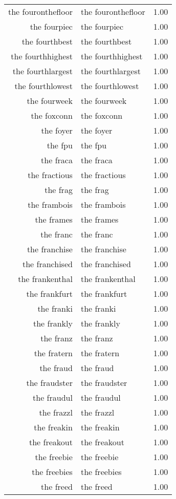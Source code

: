 \begin{table}[ht]
\begin{tabular}{rlr}
  the fouronthefloor & the fouronthefloor & 1.00 \\ 
  the fourpiec & the fourpiec & 1.00 \\ 
  the fourthbest & the fourthbest & 1.00 \\ 
  the fourthhighest & the fourthhighest & 1.00 \\ 
  the fourthlargest & the fourthlargest & 1.00 \\ 
  the fourthlowest & the fourthlowest & 1.00 \\ 
  the fourweek & the fourweek & 1.00 \\ 
  the foxconn & the foxconn & 1.00 \\ 
  the foyer & the foyer & 1.00 \\ 
  the fpu & the fpu & 1.00 \\ 
  the fraca & the fraca & 1.00 \\ 
  the fractious & the fractious & 1.00 \\ 
  the frag & the frag & 1.00 \\ 
  the frambois & the frambois & 1.00 \\ 
  the frames & the frames & 1.00 \\ 
  the franc & the franc & 1.00 \\ 
  the franchise & the franchise & 1.00 \\ 
  the franchised & the franchised & 1.00 \\ 
  the frankenthal & the frankenthal & 1.00 \\ 
  the frankfurt & the frankfurt & 1.00 \\ 
  the franki & the franki & 1.00 \\ 
  the frankly & the frankly & 1.00 \\ 
  the franz & the franz & 1.00 \\ 
  the fratern & the fratern & 1.00 \\ 
  the fraud & the fraud & 1.00 \\ 
  the fraudster & the fraudster & 1.00 \\ 
  the fraudul & the fraudul & 1.00 \\ 
  the frazzl & the frazzl & 1.00 \\ 
  the freakin & the freakin & 1.00 \\ 
  the freakout & the freakout & 1.00 \\ 
  the freebie & the freebie & 1.00 \\ 
  the freebies & the freebies & 1.00 \\ 
  the freed & the freed & 1.00 \\ 

\end{tabular}
\end{table}
